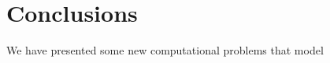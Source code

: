 \section{Conclusions}

We have presented some new computational problems that model\cite{bonizzoni_when_2014}